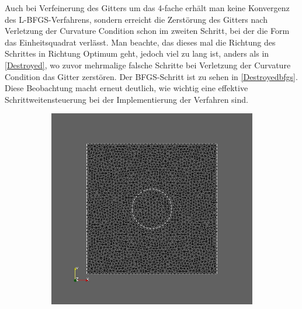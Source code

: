 \documentclass[bibliography=totoc,12pt,a4paper]{scrartcl}
\theoremstyle{exampstyle}
\numberwithin{equation}{section}
\begin{document}
Auch bei Verfeinerung des Gitters um das 4-fache erhält man keine Konvergenz des L-BFGS-Verfahrens, sondern erreicht die Zerstörung des Gitters nach Verletzung der Curvature Condition schon im zweiten Schritt, bei der die Form das Einheitsquadrat verlässt. Man beachte, das dieses mal die Richtung des Schrittes in Richtung Optimum geht, jedoch viel zu lang ist, anders als in \ref{Destroyed}, wo zuvor mehrmalige falsche Schritte bei Verletzung der Curvature Condition das Gitter zerstören. Der BFGS-Schritt ist zu sehen in \ref{Destroyedbfgs}. Diese Beobachtung macht erneut deutlich, wie wichtig eine effektive Schrittweitensteuerung bei der Implementierung der Verfahren sind.

\begin{figure}
	\begin{subfigure}{0.5\textwidth}
	\centering
	\includegraphics[scale=0.25]{pic_smallcircle_bfgsdestroyed1.jpg}
	\caption{}	
	\end{subfigure}
	\begin{subfigure}{0.5\textwidth}
	\centering

\end{subfigure}
\end{figure}
\end{document}
